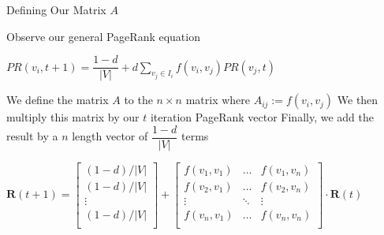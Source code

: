 \documentclass{beamer}
\begin{document}
\begin{frame}[t]{Defining Our Matrix $A$}
    \begin{outline}
        \1 Observe our general PageRank equation
        \begin{mdframed}[backgroundcolor=blue!20]
            \begin{center}
                \begin{math}
                    PR(v_i, t+1) = \dfrac{1-d}{|V|} + d\sum\limits_{v_j \in I_i} f(v_i, v_j) PR(v_j, t)
                \end{math}
            \end{center}
        \end{mdframed}
        \1 We define the matrix $A$ to the $n\times n$ matrix where $A_{ij}:= f(v_i, v_j)$
        \1 We then multiply this matrix by our $t$ iteration PageRank vector
        \1 Finally, we add the result by a $n$ length vector of $\dfrac{1-d}{|V|}$ terms
        \begin{center}
            \begin{math}
                \mathbf{R}(t+1) = \begin{bmatrix}
                    (1-d)/|V|\\
                    (1-d)/|V|\\
                    \vdots\\
                    (1-d)/|V|\\
                \end{bmatrix} + \begin{bmatrix}
                    f(v_1, v_1) & \ldots &f(v_1, v_n)\\
                    f(v_2, v_1) & \ldots &f(v_2, v_n)\\
                    \vdots & \ddots & \vdots \\
                    f(v_n, v_1) & \ldots &f(v_n, v_n)\\
                \end{bmatrix}\cdot \mathbf{R}(t)
            \end{math}
        \end{center}
    \end{outline}
\end{frame}
\end{document}
